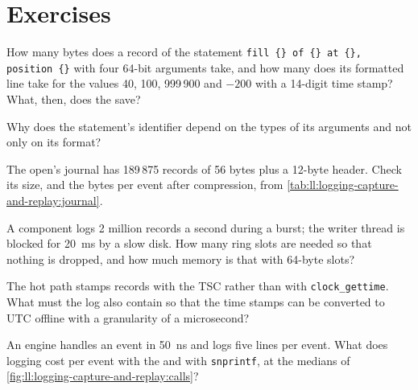 \section{Exercises}

\begin{exercise}[$\star$]\label{exo:ll:logging-capture-and-replay:1}
How many bytes does a record of the statement \texttt{\textquotedbl{}fill \{\} of \{\} at \{\}, position \{\}\textquotedbl{}} with four 64-bit arguments take,
and how many does its formatted line take for the values 40, 100, 999\,900 and $-200$ with a 14-digit time stamp? What, then,
does the  save?
\end{exercise}

\begin{exercise}[$\star$]\label{exo:ll:logging-capture-and-replay:2}
Why does the statement's identifier depend on the types of its arguments and not only on its format?
\end{exercise}

\begin{exercise}[$\star$]\label{exo:ll:logging-capture-and-replay:3}
The open's journal has 189\,875 records of 56 bytes plus a 12-byte header. Check its size, and the bytes per event after
compression, from \cref{tab:ll:logging-capture-and-replay:journal}.
\end{exercise}

\begin{exercise}[$\star\star$]\label{exo:ll:logging-capture-and-replay:4}
A component logs 2 million records a second during a burst; the writer thread is blocked for \qty{20}{\milli\second} by a slow
disk. How many ring slots are needed so that nothing is dropped, and how much memory is that with 64-byte slots?
\end{exercise}

\begin{exercise}[$\star\star$]\label{exo:ll:logging-capture-and-replay:5}
The hot path stamps records with the TSC rather than with \texttt{clock\_gettime}. What must the log also contain so that the
time stamps can be converted to UTC offline with a granularity of a microsecond?
\end{exercise}

\begin{exercise}[$\star\star$]\label{exo:ll:logging-capture-and-replay:6}
An engine handles an event in \qty{50}{\nano\second} and logs five lines per event. What does logging cost per event with the
 and with \texttt{snprintf}, at the medians of \cref{fig:ll:logging-capture-and-replay:calls}?
\end{exercise}

